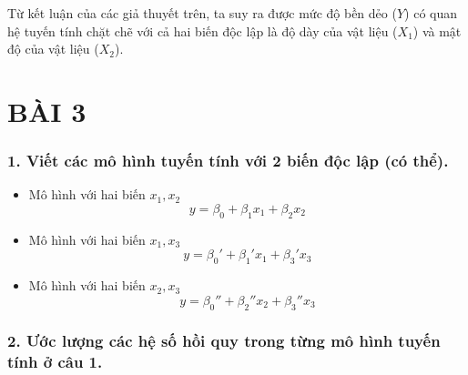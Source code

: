 \documentclass[a4paper]{article}
\theoremstyle{nonumberplain}
\begin{document}
Từ kết luận của các giả thuyết trên, ta suy ra được mức độ bền dẻo ($Y$) có quan hệ tuyến tính chặt chẽ với cả hai biến độc lập là độ dày của vật liệu ($X_1$) và mật độ của vật liệu ($X_2$).

\newpage
\section*{BÀI 3}

\subsubsection*{1. Viết các mô hình tuyến tính với 2 biến độc lập (có thể).}

\begin{itemize}
	\item Mô hình với hai biến $x_1, x_2$
	\begin{equation}\label{model:12}
		y = \beta_0 + \beta_1x_1 + \beta_2x_2
	\end{equation}
	\item Mô hình với hai biến $x_1, x_3$
	\begin{equation}\label{model:13}
		y = \beta_0' + \beta_1'x_1 + \beta_3'x_3
	\end{equation}
	\item Mô hình với hai biến $x_2, x_3$
	\begin{equation}\label{model:23}
		y = \beta_0'' + \beta_2''x_2 + \beta_3''x_3
	\end{equation}
\end{itemize}

\subsubsection*{2. Ước lượng các hệ số hồi quy trong từng mô hình tuyến tính ở câu 1.}
\end{document}
